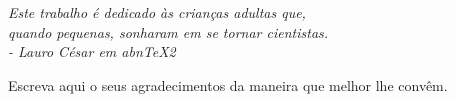 \documentclass[
	12pt,				%
	openright,			%
	oneside,			%
	a4paper,			%
	chapter=TITLE,		%
	section=TITLE,		%
	subsection=TITLE,	%
	subsubsection=TITLE,%
	english,			%
	brazil				%
	]{abntex2}
\theoremstyle{definition}
\begin{document}
\nocite{Vrs:2018}

\frenchspacing 



\imprimircapa

\imprimirfolhaderosto


%    


\newpage

%
\begin{folhadeaprovacao}
\imprimirfolhadeaprovacao
\end{folhadeaprovacao}





\begin{dedicatoria}
   \vspace*{\fill}
   \flushright
   \textit{Este trabalho é dedicado às crianças adultas que,\\
   quando pequenas, sonharam em se tornar cientistas. \\
   - Lauro César em abnTeX2}
\end{dedicatoria}

\begin{agradecimentos}

Escreva aqui o seus agradecimentos da maneira que melhor lhe convêm.

\end{agradecimentos}
\end{document}
